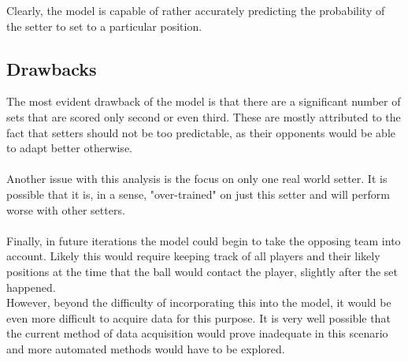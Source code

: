 \documentclass[main.tex]{subfiles}
\begin{document}
        Clearly, the model is capable of rather accurately predicting the probability of the setter to set to a particular position.
        
      \subsection{Drawbacks}
        
        The most evident drawback of the model is that there are a significant number of sets that are scored only second or even third. These are mostly attributed to the fact that setters should not be too predictable, as their opponents would be able to adapt better otherwise. 
        \\\\
        Another issue with this analysis is the focus on only one real world setter. It is possible that it is, in a sense, "over-trained" on just this setter and will perform worse with other setters.
        \\\\Finally, in future iterations the model could begin to take the opposing team into account. Likely this would require keeping track of all players and their likely positions at the time that the ball would contact the player, slightly after the set happened. \\
        However, beyond the difficulty of incorporating this into the model, it would be even more difficult to acquire data for this purpose. It is very well possible that the current method of data acquisition would prove inadequate in this scenario and more automated methods would have to be explored.
      
\end{document}
